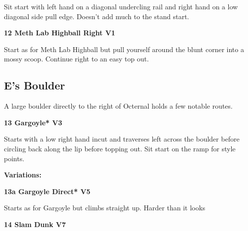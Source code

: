 \begin{multicols}{2}
\begin{adjustwidth}{0.5cm}{}
							\begin{adjustwidth}{0.5cm}{}				
							Sit start with left hand on a diagonal undercling rail and right hand on a low diagonal side pull edge. Doesn't add much to the stand start.
							\end{adjustwidth}
						\end{adjustwidth}
					\label{rt:Meth Lab Highball Right}
\colorbox{green!20}{
\parbox{0.95\linewidth}{
\textbf{
12 Meth Lab Highball Right V1   
}
}
}

					\begin{adjustwidth}{0.5cm}{}				
					Start as for Meth Lab Highball but pull yourself around the blunt corner into a mossy scoop. Continue right to an easy top out.
					\end{adjustwidth}
			\subsection*{E's Boulder}\label{bf:E's Boulder}
			A large boulder directly to the right of Octernal holds a few notable routes.\\
			

					\label{rt:Gargoyle}
\colorbox{green!20}{
\parbox{0.95\linewidth}{
\textbf{
13 Gargoyle* V3    
}
}
}

					\begin{adjustwidth}{0.5cm}{}				
					Starts with a low right hand incut and traverses left across the boulder before circling back along the lip before topping out. Sit start on the ramp for style points.
					\end{adjustwidth}
						\begin{adjustwidth}{0.5cm}{}				
						\textbf{Variations:} \newline
							\label{vr:Gargoyle Direct}
\colorbox{RoyalBlue!20}{
\parbox{0.95\linewidth}{
\textbf{
13a Gargoyle Direct* V5    
}
}
}

							\begin{adjustwidth}{0.5cm}{}				
							Starts as for Gargoyle but climbs straight up. Harder than it looks
							\end{adjustwidth}
						\end{adjustwidth}

					\label{rt:Slam Dunk}
\colorbox{Goldenrod!50}{
\parbox{0.95\linewidth}{
\textbf{
14 Slam Dunk V7  
}
}
}


\end{multicols}
